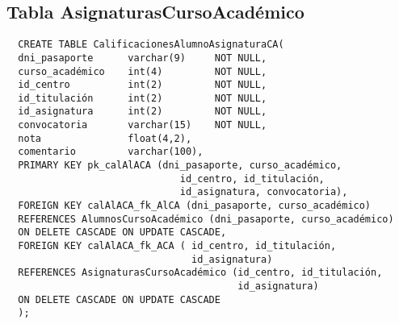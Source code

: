\subsection{Tabla AsignaturasCursoAcadémico}

\begin{verbatim}
  CREATE TABLE CalificacionesAlumnoAsignaturaCA(
  dni_pasaporte      varchar(9)     NOT NULL,
  curso_académico    int(4)         NOT NULL,
  id_centro          int(2)         NOT NULL,
  id_titulación      int(2)         NOT NULL,
  id_asignatura      int(2)         NOT NULL,
  convocatoria       varchar(15)    NOT NULL,
  nota               float(4,2),
  comentario         varchar(100),
  PRIMARY KEY pk_calAlACA (dni_pasaporte, curso_académico,
                              id_centro, id_titulación,
                              id_asignatura, convocatoria),
  FOREIGN KEY calAlACA_fk_AlCA (dni_pasaporte, curso_académico)
  REFERENCES AlumnosCursoAcadémico (dni_pasaporte, curso_académico)
  ON DELETE CASCADE ON UPDATE CASCADE,
  FOREIGN KEY calAlACA_fk_ACA ( id_centro, id_titulación,
                                id_asignatura)
  REFERENCES AsignaturasCursoAcadémico (id_centro, id_titulación,
                                        id_asignatura)
  ON DELETE CASCADE ON UPDATE CASCADE
  );
\end{verbatim}